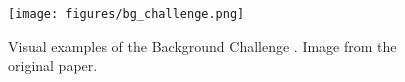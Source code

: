 \begin{figure}[h]
\centering\small
\texttt{[image: figures/bg\_challenge.png]}
\caption{
Visual examples of the Background Challenge \citep{xiao2021noise}. Image from the original paper.
}\label{fig:bg-challenge}
\end{figure}
